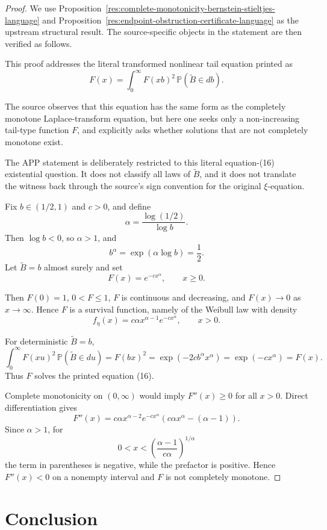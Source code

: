 \documentclass[11pt]{article}
\numberwithin{equation}{section}
\theoremstyle{definition}
\theoremstyle{remark}
\newcommand{\1}{\mathbf 1}
\begin{document}
\begin{proof}
We use Proposition~\ref{res:complete-monotonicity-bernstein-stieltjes-language} and Proposition~\ref{res:endpoint-obstruction-certificate-language} as the upstream structural result. The source-specific objects in the statement are then verified as follows.

This proof addresses the literal transformed nonlinear tail equation printed as
\[
F(x)=\int_0^\infty F(xb)^2\,\mathbb P(\widetilde B\in db).
\]

The source observes that this equation has the same form as the completely
monotone Laplace-transform equation, but here one seeks only a non-increasing
tail-type function \(F\), and explicitly asks whether solutions that are not
completely monotone exist.

The APP statement is deliberately restricted to this literal equation-(16)
existential question. It does not classify all laws of \(\widetilde B\), and it
does not translate the witness back through the source's sign convention for
the original \(\xi\)-equation.

Fix \(b\in(1/2,1)\) and \(c>0\), and define
\[
\alpha=\frac{\log(1/2)}{\log b}.
\]
Then \(\log b<0\), so \(\alpha>1\), and
\[
b^\alpha=\exp(\alpha\log b)=\frac12.
\]
Let \(\widetilde B=b\) almost surely and set
\[
F(x)=e^{-cx^\alpha},\qquad x\ge0.
\]

Then \(F(0)=1\), \(0<F\le1\), \(F\) is continuous and decreasing, and
\(F(x)\to0\) as \(x\to\infty\). Hence \(F\) is a survival function, namely of
the Weibull law with density
\[
f_\eta(x)=c\alpha x^{\alpha-1}e^{-cx^\alpha},\qquad x>0.
\]

For deterministic \(\widetilde B=b\),
\[
\int_0^\infty F(xu)^2\,\mathbb P(\widetilde B\in du)
=F(bx)^2
=\exp(-2cb^\alpha x^\alpha)
=\exp(-cx^\alpha)
=F(x).
\]
Thus \(F\) solves the printed equation (16).

Complete monotonicity on \((0,\infty)\) would imply \(F''(x)\ge0\) for all
\(x>0\). Direct differentiation gives
\[
F''(x)=c\alpha x^{\alpha-2}e^{-cx^\alpha}
\left(c\alpha x^\alpha-(\alpha-1)\right).
\]
Since \(\alpha>1\), for
\[
0<x<\left(\frac{\alpha-1}{c\alpha}\right)^{1/\alpha}
\]
the term in parentheses is negative, while the prefactor is positive. Hence
\(F''(x)<0\) on a nonempty interval and \(F\) is not completely monotone.
\end{proof}

\section{Conclusion}
\end{document}
